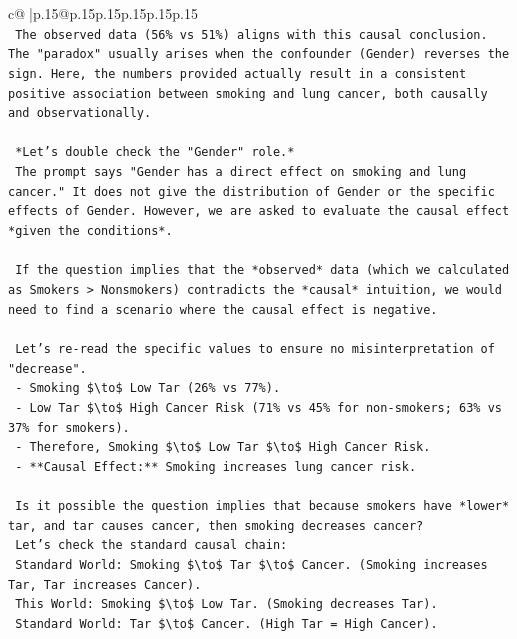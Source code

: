 \documentclass{article}
\begin{document}
{\begin{supertabular}{c@{$\;$}|p{.15\linewidth}@{}p{.15\linewidth}p{.15\linewidth}p{.15\linewidth}p{.15\linewidth}p{.15\linewidth}}
{{{\\ 
\texttt{    The observed data (56\% vs 51\%) aligns with this causal conclusion. The "paradox" usually arises when the confounder (Gender) reverses the sign. Here, the numbers provided actually result in a consistent positive association between smoking and lung cancer, both causally and observationally.} \\
\\ 
\texttt{    *Let's double check the "Gender" role.*} \\
\texttt{    The prompt says "Gender has a direct effect on smoking and lung cancer." It does not give the distribution of Gender or the specific effects of Gender. However, we are asked to evaluate the causal effect *given the conditions*.} \\
\\ 
\texttt{    If the question implies that the *observed* data (which we calculated as Smokers > Nonsmokers) contradicts the *causal* intuition, we would need to find a scenario where the causal effect is negative.} \\
\\ 
\texttt{    Let's re{-}read the specific values to ensure no misinterpretation of "decrease".} \\
\texttt{    {-} Smoking \$\textbackslash{}to\$ Low Tar (26\% vs 77\%).} \\
\texttt{    {-} Low Tar \$\textbackslash{}to\$ High Cancer Risk (71\% vs 45\% for non{-}smokers; 63\% vs 37\% for smokers).} \\
\texttt{    {-} Therefore, Smoking \$\textbackslash{}to\$ Low Tar \$\textbackslash{}to\$ High Cancer Risk.} \\
\texttt{    {-} **Causal Effect:** Smoking increases lung cancer risk.} \\
\\ 
\texttt{    Is it possible the question implies that because smokers have *lower* tar, and tar causes cancer, then smoking decreases cancer?} \\
\texttt{    Let's check the standard causal chain:} \\
\texttt{    Standard World: Smoking \$\textbackslash{}to\$ Tar \$\textbackslash{}to\$ Cancer. (Smoking increases Tar, Tar increases Cancer).} \\
\texttt{    This World: Smoking \$\textbackslash{}to\$ Low Tar. (Smoking decreases Tar).} \\
\texttt{    Standard World: Tar \$\textbackslash{}to\$ Cancer. (High Tar = High Cancer).} \\
}}}
\end{supertabular}}
\end{document}
